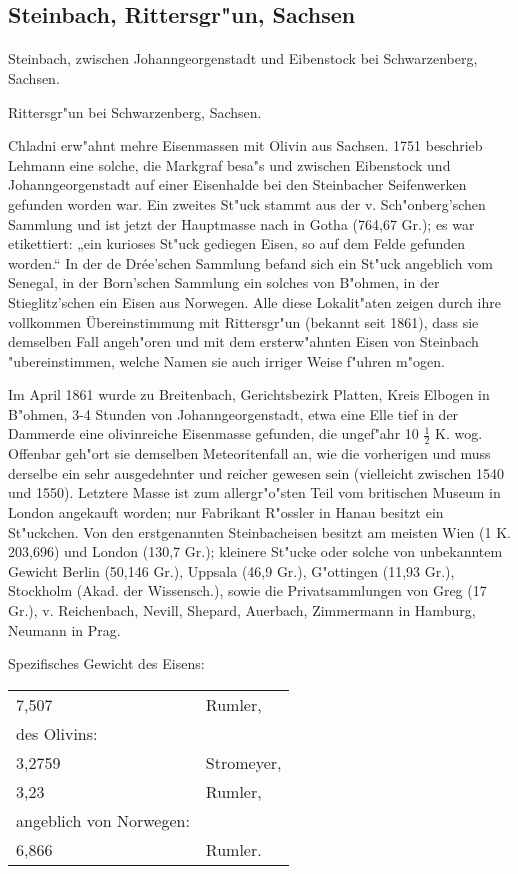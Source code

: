 \documentclass[a4paper, 11pt, oneside]{article}
\begin{document}
\subsection{Steinbach, Rittersgr"un, Sachsen}
\normalsize
\paragraph{}
Steinbach, zwischen Johanngeorgenstadt und Eibenstock bei Schwarzenberg, Sachsen.

Rittersgr"un bei Schwarzenberg, Sachsen.

Chladni erw"ahnt mehre Eisenmassen mit Olivin aus Sachsen. 1751 beschrieb Lehmann eine solche, die Markgraf besa"s und zwischen Eibenstock und Johanngeorgenstadt auf einer Eisenhalde bei den Steinbacher Seifenwerken gefunden worden war. Ein zweites St"uck stammt aus der v. Sch"onberg'schen Sammlung und ist jetzt der Hauptmasse nach in Gotha (764,67 Gr.); es war etikettiert: „ein kurioses St"uck gediegen Eisen, so auf dem Felde gefunden worden.“ In der de Drée'schen Sammlung befand sich ein St"uck angeblich vom Senegal, in der Born'schen Sammlung ein solches von B"ohmen, in der Stieglitz'schen ein Eisen aus Norwegen. Alle diese Lokalit"aten zeigen durch ihre vollkommen Übereinstimmung mit Rittersgr"un (bekannt seit 1861), dass sie demselben Fall angeh"oren und mit dem ersterw"ahnten Eisen von Steinbach "ubereinstimmen, welche Namen sie auch irriger Weise f"uhren m"ogen.

Im April 1861 wurde zu Breitenbach, Gerichtsbezirk Platten, Kreis Elbogen in B"ohmen, 3-4 Stunden von Johanngeorgenstadt, etwa eine Elle tief in der Dammerde eine olivinreiche Eisenmasse gefunden, die ungef"ahr 10 $\frac{1}{2}$ K. wog. Offenbar geh"ort sie demselben Meteoritenfall an, wie die vorherigen und muss derselbe ein sehr ausgedehnter und reicher gewesen sein (vielleicht zwischen 1540 und 1550). Letztere Masse ist zum allergr"o"sten Teil vom britischen Museum in London angekauft worden; nur Fabrikant R"ossler in Hanau besitzt ein St"uckchen. Von den erstgenannten Steinbacheisen besitzt am meisten Wien (1 K. 203,696) und London (130,7 Gr.); kleinere St"ucke oder solche von unbekanntem Gewicht Berlin (50,146 Gr.), Uppsala (46,9 Gr.), G"ottingen (11,93 Gr.), Stockholm (Akad. der Wissensch.), sowie die Privatsammlungen von Greg (17 Gr.), v. Reichenbach, Nevill, Shepard, Auerbach, Zimmermann in Hamburg, Neumann in Prag.

Spezifisches Gewicht des Eisens:
\begin{table}[!ht]
    \centering
    \begin{tabular}{l l}
        7,507 & Rumler,\\
        des Olivins: & \\
        3,2759 & Stromeyer,\\
        3,23 & Rumler,\\
        angeblich von Norwegen: &\\
        6,866 & Rumler.
    \end{tabular}
\end{table}
\end{document}
